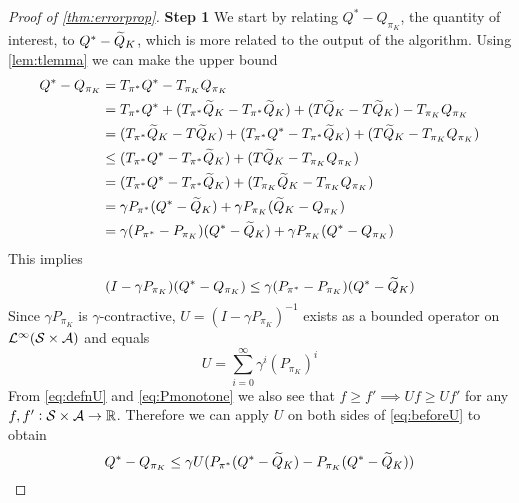 \begin{proof}[Proof of \cref{thm:errorprop}]
  \textbf{Step 1}
  We start by relating $Q^* - Q_{\pi_K}$, the quantity of interest,
  to $Q^* - \widetilde{Q}_K$, which is more related to the output of the algorithm.
  Using \cref{lem:tlemma} we can make the upper bound
  \begin{align}
    Q^* - Q_{\pi_K} &= T_{\pi^*} Q^* - T_{\pi_K} Q_{\pi_K} \notag
    \\ &= T_{\pi^*} Q^* + (T_{\pi^*} \widetilde{Q}_K - T_{\pi^*} \widetilde{Q}_K)
    + (T \widetilde{Q}_K - T \widetilde{Q}_K)- T_{\pi_K} Q_{\pi_K} \notag
    \\ &= (T_{\pi^*} \widetilde{Q}_K - T \widetilde{Q}_K)
    + (T_{\pi^*} Q^* - T_{\pi^*} \widetilde{Q}_K) 
    + (T \widetilde{Q}_K - T_{\pi_K} Q_{\pi_K}) \notag
    \\ &\leq (T_{\pi^*} Q^* - T_{\pi^*} \widetilde{Q}_K) 
    + (T \widetilde{Q}_K - T_{\pi_K} Q_{\pi_K}) \notag
    \\ &= (T_{\pi^*} Q^* - T_{\pi^*} \widetilde{Q}_K) 
    + (T_{\pi_K} \widetilde{Q}_K - T_{\pi_K} Q_{\pi_K}) \notag
    \\ &= \gamma P_{\pi^*} (Q^* - \widetilde{Q}_K)
    + \gamma P_{\pi_K} (\widetilde{Q}_K - Q_{\pi_K}) \notag
    \\ &= \gamma (P_{\pi^*} - P_{\pi_K})(Q^* - \widetilde{Q}_K)
    + \gamma P_{\pi_K} (Q^* - Q_{\pi_K}) \label{preU}
  \end{align}
  This implies
  \begin{equation} (I - \gamma P_{\pi_K})(Q^* - Q_{\pi_K})
    \leq \gamma (P_{\pi^*} - P_{\pi_K})(Q^* - \widetilde{Q}_K)
    \label{eq:beforeU}
  \end{equation}
  Since $\gamma P_{\pi_K}$ is $\gamma$-contractive,
  $U = (I - \gamma P_{\pi_K})^{-1}$ exists as a bounded operator on
  $\mathcal{L}^\infty(\mathcal{S}\times \mathcal{A})$ and equals
  \begin{equation}
    U = \sum_{i=0}^\infty \gamma^i (P_{\pi_K})^i
    \label{eq:defnU}
  \end{equation}
  From \cref{eq:defnU} and \cref{eq:Pmonotone}
  we also see that $f \geq f' \implies U f \geq U f'$ for any
  $f, f' : \mathcal{S}\times \mathcal{A} \to \mathbb{R}$.
  Therefore we can apply $U$ on both sides of \cref{eq:beforeU} to obtain 
  \begin{equation} Q^* - Q_{\pi_K} \leq \gamma U (P_{\pi^*}(Q^* - \widetilde{Q}_K)
  - P_{\pi_K} (Q^* - \widetilde{Q}_K)) \label{eq:qq1} \end{equation} 


\end{proof}
